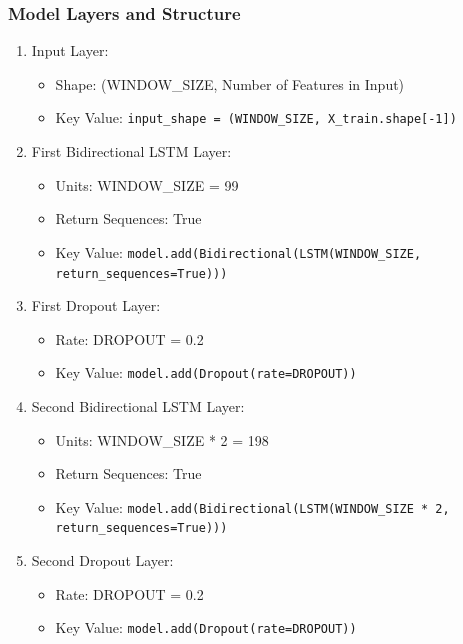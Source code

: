 \subsubsection{Model Layers and Structure}

\begin{enumerate}
    \item {Input Layer}:
    \begin{itemize}
        \item Shape: (WINDOW\_SIZE, Number of Features in Input)
        \item Key Value: \texttt{input\_shape = (WINDOW\_SIZE, X\_train.shape[-1])}
    \end{itemize}

    \item {First Bidirectional LSTM Layer}:
    \begin{itemize}
        \item Units: WINDOW\_SIZE = 99
        \item Return Sequences: True
        \item Key Value: \texttt{model.add(Bidirectional(LSTM(WINDOW\_SIZE, return\_sequences=True)))}
    \end{itemize}

    \item {First Dropout Layer}:
    \begin{itemize}
        \item Rate: DROPOUT = 0.2
        \item Key Value: \texttt{model.add(Dropout(rate=DROPOUT))}
    \end{itemize}

    \item {Second Bidirectional LSTM Layer}:
    \begin{itemize}
        \item Units: WINDOW\_SIZE * 2 = 198
        \item Return Sequences: True
        \item Key Value: \texttt{model.add(Bidirectional(LSTM(WINDOW\_SIZE * 2, return\_sequences=True)))}
    \end{itemize}

    \item {Second Dropout Layer}:
    \begin{itemize}
        \item Rate: DROPOUT = 0.2
        \item Key Value: \texttt{model.add(Dropout(rate=DROPOUT))}
    \end{itemize}


\end{enumerate}
